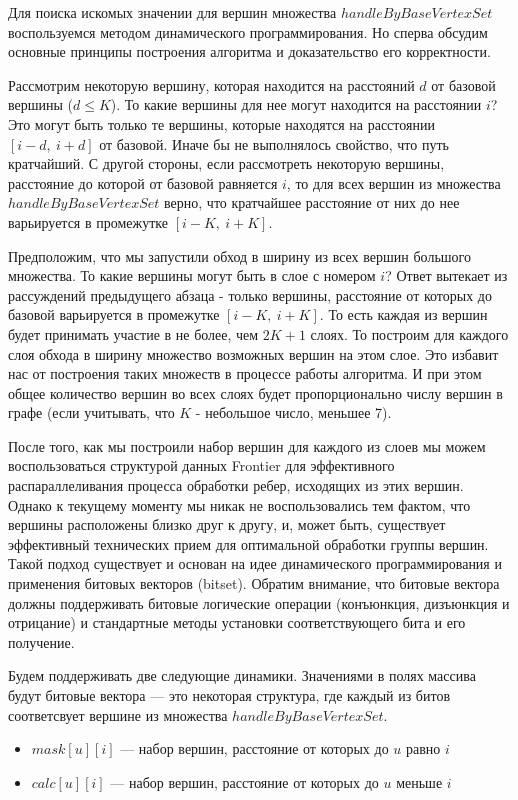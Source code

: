Для поиска искомых значении для вершин множества $handleByBaseVertexSet$ воспользуемся методом динамического программирования. Но сперва обсудим основные принципы построения алгоритма и доказательство его корректности. 

Рассмотрим некоторую вершину, которая находится на расстояний $d$ от базовой вершины ($d \leq K$). То какие вершины для нее могут находится на расстоянии $i$? Это могут быть только те вершины, которые находятся на расстоянии $[i-d, \ i+d]$ от базовой. Иначе бы не выполнялось свойство, что путь кратчайший. С другой стороны, если рассмотреть некоторую вершины, расстояние до которой от базовой равняется $i$, то для всех вершин из множества $handleByBaseVertexSet$ верно, что кратчайшее расстояние от них до нее варьируется в промежутке $[i-K, \ i+K]$. 

 Предположим, что мы запустили обход в ширину из всех вершин большого множества. То какие вершины могут быть в слое с номером $i$? Ответ вытекает из рассуждений предыдущего абзаца - только вершины, расстояние от которых до базовой варьируется в промежутке $[i-K, \ i+K]$. То есть каждая из вершин будет принимать участие в не более, чем $2K+1$ слоях. То построим для каждого слоя обхода в ширину множество возможных вершин на этом слое. Это избавит нас от построения таких множеств в процессе работы алгоритма. И при этом общее количество вершин во всех слоях будет пропорционально числу вершин в графе (если учитывать, что $K$ - небольшое число, меньшее 7). 
 
 После того, как мы построили набор вершин для каждого из слоев мы можем воспользоваться структурой данных Frontier для эффективного распараллеливания процесса обработки ребер, исходящих из этих вершин. Однако к текущему моменту мы никак не воспользовались тем фактом, что вершины расположены близко друг к другу, и, может быть, существует эффективный технических прием для оптимальной обработки группы вершин. Такой подход существует и основан на идее динамического программирования и применения битовых векторов (bitset). Обратим внимание, что битовые вектора должны поддерживать битовые логические операции (конъюнкция, дизъюнкция и отрицание) и стандартные методы установки соответствующего бита и его получение.
 
 Будем поддерживать две следующие динамики. Значениями в полях массива будут битовые вектора --- это некоторая структура, где каждый из битов соответсвует вершине из множества $handleByBaseVertexSet$. 
 
 \begin{itemize}
  \item $mask[u][i]$ --- набор вершин, расстояние от которых до $u$ равно $i$ 
  \item $calc[u][i]$ --- набор вершин, расстояние от которых до $u$ меньше $i$
\end{itemize}
 
